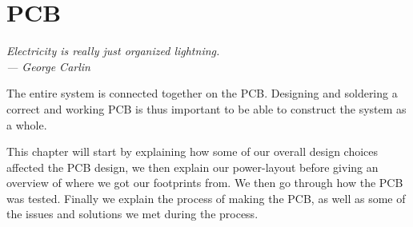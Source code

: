 \chapter{PCB}\label{ch:pcb}

\begin{flushright}{\slshape
    Electricity is really just organized lightning.\\ \medskip
    --- George Carlin}
\end{flushright}

The entire system is connected together on the PCB. Designing and soldering
a correct and working PCB is thus important to be able to construct the system
as a whole.

This chapter will start by explaining how some of our overall design choices
affected the PCB design, we then explain our power-layout before giving an
overview of where we got our footprints from. We then go through how the PCB
was tested. Finally we explain the process of making the PCB, as well as some
of the issues and solutions we met during the process.



%



%



